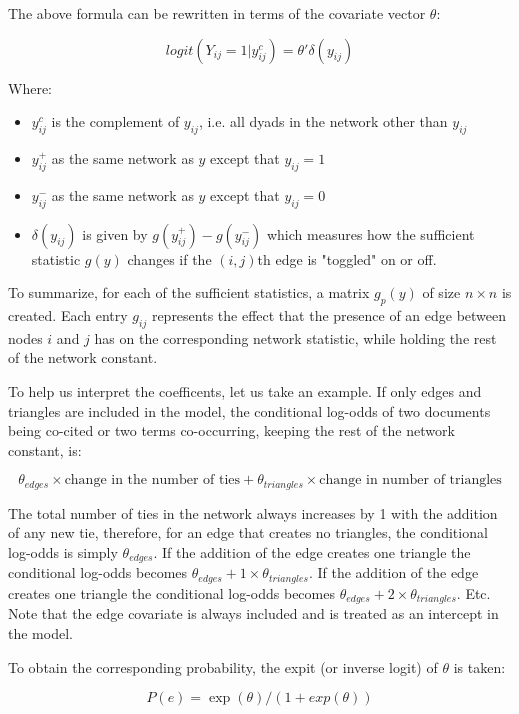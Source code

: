 The above formula can be rewritten in terms of the covariate vector $\theta$:

$$
logit(Y_{ij} = 1 | y_{ij}^c) = \theta' \delta(y_{ij})
$$

Where:
\begin{itemize}
\item $y_{ij}^c$ is the complement of $y_{ij}$, i.e. all dyads in the network other than $y_{ij}$
\item $y_{ij}^+$ as the same network as $y$ except that $y_{ij} = 1$
\item $y_{ij}^-$ as the same network as $y$ except that $y_{ij} = 0$
\item $\delta(y_{ij})$ is given by $g(y_{ij}^+) - g(y_{ij}^-)$ which measures how the sufficient 
statistic $g(y)$ changes if the $(i, j)$th edge is "toggled" on or off.
\end{itemize}

To summarize, for each of the sufficient statistics, a matrix $g_p(y)$ of size $n \times n$ is created. Each entry $g_{ij}$ represents the effect that the presence of an edge between nodes $i$ and $j$ has on the corresponding network statistic, while holding the rest of the network constant.

To help us interpret the coefficents, let us take an example. If only edges and triangles are included in the model, the conditional log-odds of two documents being co-cited or two terms co-occurring, keeping the rest of the network constant, is:

$$
\theta_{edges} \times \text{change in the number of ties} + \theta_{triangles} \times \text{change in number of triangles}
$$

The total number of ties in the network always increases by 1 with the addition of any new tie, therefore, for an edge that creates no triangles, the conditional log-odds is simply $\theta_{edges}$. If the addition of the edge creates one triangle the conditional log-odds becomes $\theta_{edges} + 1 \times \theta_{triangles}$. If the addition of the edge creates one triangle the conditional log-odds becomes $\theta_{edges} + 2 \times \theta_{triangles}$. Etc. Note that the edge covariate is always included and is treated as an intercept in the model.

To obtain the corresponding probability, the expit (or inverse logit) of $\theta$ is taken:

$$
P(e) = \exp(\theta)/(1 + exp(\theta))
$$


